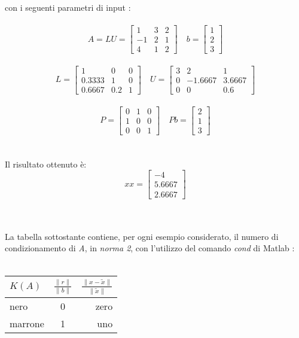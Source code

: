 \begin{description}
	con i seguenti parametri di input :\\\	  
	\[
	A = LU =\begin{bmatrix}
		1  & 3 & 2 \\ 
		-1 & 2 & 1 \\
		4  & 1 & 2 
	\end{bmatrix} \quad
	b =\begin{bmatrix}
		1 \\
		2 \\
		3 
	\end{bmatrix}
	\]\\
	\[
	L =\begin{bmatrix}
		   1   &  0  & 0 \\ 
		0.3333 &  1  & 0 \\
		0.6667 & 0.2 & 1 
	\end{bmatrix} \quad
	U =\begin{bmatrix}
		3 &    2    &    1   \\ 
		0 & -1.6667 & 3.6667 \\
		0 &    0    &   0.6 
	\end{bmatrix}
	\]\\ 
	\[
	P =\begin{bmatrix}
		0 & 1 & 0 \\ 
		1 & 0 & 0 \\
		0 & 0 & 1 
	\end{bmatrix} \quad
	Pb =\begin{bmatrix}
		2 \\
		1 \\
		3                
	\end{bmatrix}
	\]\\\\
	Il risultato ottenuto è:\\
	\[
	xx =\begin{bmatrix}
		  -4   \\
		5.6667 \\
		2.6667 
	\end{bmatrix}
	\]\\\\
\end{description}
La tabella sottostante contiene, per ogni esempio considerato, il numero di condizionamento di \textit{A}, in \textit{norma 2}, con l'utilizzo del comando \textit{cond} di Matlab :\\\
\begin{center}
\begin{tabular}{ | l | c | r | }
	\hline
	$K(A)$    & $\frac{\|r\|}{\|b\|}$ & $\frac{\|x-\tilde{x}\|}{\|\tilde{x}\|}$ \\
	\hline
	nero    & 0           & zero                                          \\
	marrone & 1           & uno                                           \\
	\hline
\end{tabular}
\end{center}